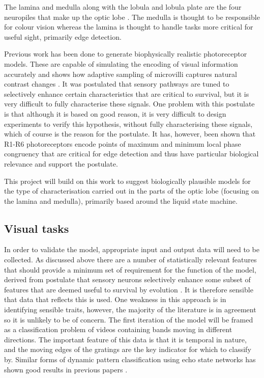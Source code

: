 \documentclass[fleqn,12pt]{wlscirep}
\begin{document}
The lamina and medulla along with the lobula and lobula plate are the four neuropiles that make up the optic lobe \cite{morante_color_2008}. The medulla is thought to be responsible for colour vision \cite{morante_color_2008} whereas the lamina is thought to handle tasks more critical for useful sight, primarily edge detection.

Previous work has been done to generate biophysically realistic photoreceptor models. These are capable of simulating the encoding of visual information accurately and shows how adaptive sampling of microvilli captures natural contrast changes \cite{song_stochastic_2012}. It was postulated that sensory pathways are tuned to selectively enhance certain characteristics that are critical to survival, but it is very difficult to fully characterise these signals.  One problem with this postulate is that although it is based on good reason, it is very difficult to design experiments to verify this hypothesis, without fully characterising these signals, which of course is the reason for the postulate. It has, however, been shown that R1-R6 photoreceptors encode points of maximum and minimum local phase congruency that are critical for edge detection \cite{friederich_fly_2016} and thus have particular biological relevance and support the postulate.

This project will build on this work to suggest biologically plausible models for the type of characterisation carried out in the parts of the optic lobe (focusing on the lamina and medulla), primarily based around the liquid state machine.

\subsection*{Visual tasks}
In order to validate the model, appropriate input and output data will need to be collected. As discussed above there are a number of statistically relevant features that should provide a minimum set of requirement for the function of the model, derived from postulate that sensory neurons selectively enhance some subset of features that are deemed useful to survival by evolution \cite{friederich_fly_2016}\cite{simoncelli_natural_2001}. It is therefore sensible that data that reflects this is used. One weakness in this approach is in identifying sensible traits, however, the majority of the literature is in agreement so it is unlikely to be of concern. The first iteration of the model will be framed as a classification problem of videos containing bands moving in different directions. The important feature of this data is that it is temporal in nature, and the moving edges of the gratings are the key indicator for which to classify by. Similar forms of dynamic pattern classification using echo state networks has shown good results in previous papers \cite{tanaka_recent_2018}.
\end{document}
